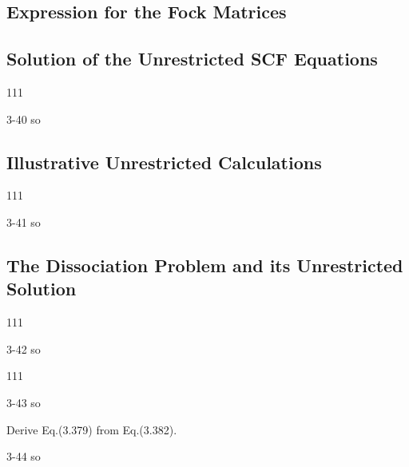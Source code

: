 \documentclass[a4paper]{book}
\begin{document}
	\subsection{Expression for the Fock Matrices}
	
	\subsection{Solution of the Unrestricted SCF Equations}
	
	\begin{exercise}
	111
	\end{exercise}
	
	\begin{solution}
		3-40 so
	\end{solution}
	
	\subsection{Illustrative Unrestricted Calculations}
	
	\begin{exercise}
	111
	\end{exercise}
	
	\begin{solution}
		3-41 so
	\end{solution}
	
	\subsection{The Dissociation Problem and its Unrestricted Solution}
	
	\begin{exercise}
	111
	\end{exercise}
	
	\begin{solution}
		3-42 so
	\end{solution}
	
	\begin{exercise}
	111
	\end{exercise}
	
	\begin{solution}
		3-43 so
	\end{solution}
	
	\begin{exercise}
	Derive Eq.(3.379) from Eq.(3.382).
	\end{exercise}
	
	\begin{solution}
		3-44 so
	\end{solution}
\end{document}

